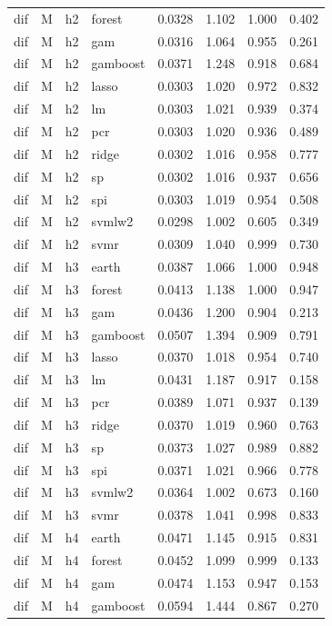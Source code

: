 \begin{ThreePartTable}
\begin{longtable}[t]{llclcccc}
dif & M & h2 & forest & 0.0328 & 1.102 & 1.000 & 0.402\\
dif & M & h2 & gam & 0.0316 & 1.064 & 0.955 & 0.261\\
dif & M & h2 & gamboost & 0.0371 & 1.248 & 0.918 & 0.684\\
dif & M & h2 & lasso & 0.0303 & 1.020 & 0.972 & 0.832\\
dif & M & h2 & lm & 0.0303 & 1.021 & 0.939 & 0.374\\
dif & M & h2 & pcr & 0.0303 & 1.020 & 0.936 & 0.489\\
dif & M & h2 & ridge & 0.0302 & 1.016 & 0.958 & 0.777\\
dif & M & h2 & sp & 0.0302 & 1.016 & 0.937 & 0.656\\
dif & M & h2 & spi & 0.0303 & 1.019 & 0.954 & 0.508\\
dif & M & h2 & svmlw2 & 0.0298 & 1.002 & 0.605 & 0.349\\
dif & M & h2 & svmr & 0.0309 & 1.040 & 0.999 & 0.730\\
\addlinespace
dif & M & h3 & earth & 0.0387 & 1.066 & 1.000 & 0.948\\
dif & M & h3 & forest & 0.0413 & 1.138 & 1.000 & 0.947\\
dif & M & h3 & gam & 0.0436 & 1.200 & 0.904 & 0.213\\
dif & M & h3 & gamboost & 0.0507 & 1.394 & 0.909 & 0.791\\
dif & M & h3 & lasso & 0.0370 & 1.018 & 0.954 & 0.740\\
dif & M & h3 & lm & 0.0431 & 1.187 & 0.917 & 0.158\\
dif & M & h3 & pcr & 0.0389 & 1.071 & 0.937 & 0.139\\
dif & M & h3 & ridge & 0.0370 & 1.019 & 0.960 & 0.763\\
dif & M & h3 & sp & 0.0373 & 1.027 & 0.989 & 0.882\\
dif & M & h3 & spi & 0.0371 & 1.021 & 0.966 & 0.778\\
dif & M & h3 & svmlw2 & 0.0364 & 1.002 & 0.673 & 0.160\\
dif & M & h3 & svmr & 0.0378 & 1.041 & 0.998 & 0.833\\
\addlinespace
dif & M & h4 & earth & 0.0471 & 1.145 & 0.915 & 0.831\\
dif & M & h4 & forest & 0.0452 & 1.099 & 0.999 & 0.133\\
dif & M & h4 & gam & 0.0474 & 1.153 & 0.947 & 0.153\\
dif & M & h4 & gamboost & 0.0594 & 1.444 & 0.867 & 0.270\\

\end{longtable}
\end{ThreePartTable}
